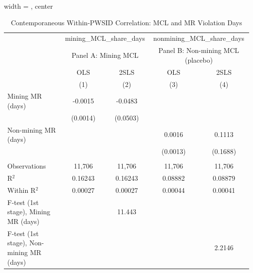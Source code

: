
\begin{table}[htbp]
   
   \caption{\label{tab:strategic_contemp_corr} Contemporaneous Within-PWSID Correlation: MCL and MR Violation Days}
   \bigskip
   
   \centering
   
   \begin{adjustbox}{width = \textwidth, center}
      
      
      \begin{tabular}{lcccc}
         \toprule
         
          & \multicolumn{2}{c}{mining\_MCL\_share\_days} & \multicolumn{2}{c}{nonmining\_MCL\_share\_days}\\
         
          & \multicolumn{2}{c}{Panel A: Mining MCL} & \multicolumn{2}{c}{Panel B: Non-mining MCL (placebo)} \\ 
                                                  & OLS           & 2SLS          & OLS           & 2SLS  \\   
         
                                                  & (1)           & (2)           & (3)           & (4)\\  
         
         \midrule 
         Mining MR (days)                         & -0.0015       & -0.0483       &               &   \\   
                                                  & (0.0014)      & (0.0503)      &               &   \\   
         Non-mining MR (days)                     &               &               & 0.0016        & 0.1113\\   
                                                  &               &               & (0.0013)      & (0.1688)\\   
         
          \\
         
         Observations                             & 11,706        & 11,706        & 11,706        & 11,706\\  
         R$^2$                                    & 0.16243       & 0.16243       & 0.08882       & 0.08879\\  
         Within R$^2$                             & 0.00027       & 0.00027       & 0.00044       & 0.00041\\  
         F-test (1st stage), Mining MR (days)     &               & 11.443        &               & \\  
         F-test (1st stage), Non-mining MR (days) &               &               &               & 2.2146\\  
         

\end{tabular}
\end{adjustbox}
\end{table}
